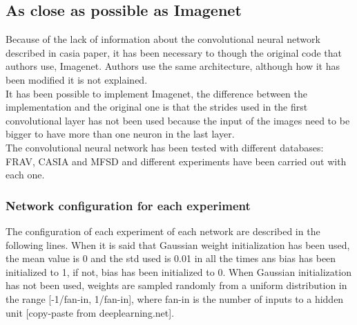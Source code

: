 \clearpage


\subsection{As close as possible as Imagenet}
Because of the lack of information about the convolutional neural network described in casia paper, it has been necessary  to though the original code that authors use, Imagenet. Authors use the same architecture, although how it has been modified it is not explained. \\

It has been possible to implement Imagenet, the difference between the implementation and the original one is that the strides used in the first convolutional layer has not been used because the input of the images need to be bigger to have more than one neuron in the last layer.\\


The convolutional neural network has been tested with different databases: FRAV, CASIA and MFSD and different experiments have been carried out with each one.\\

\subsubsection{Network configuration for each experiment}
The configuration of each experiment of each network are described in the following lines. When it is said that Gaussian weight initialization has been used, the mean value is 0 and the std used is 0.01 in all the times ans bias has been initialized to 1, if not, bias has been initialized to 0. When Gaussian initialization has not been used,  weights are sampled randomly from a uniform distribution in the range [-1/fan-in, 1/fan-in], where fan-in is the number of inputs to a hidden unit [copy-paste from deeplearning.net]. \\

